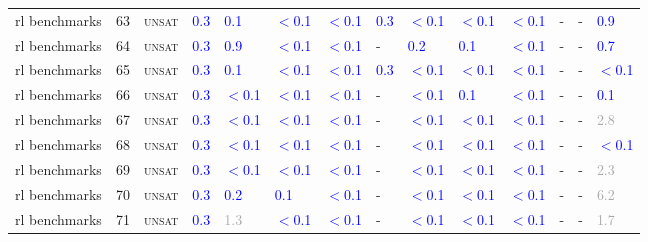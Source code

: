 \begin{center}
{\begin{longtable}{@{}llllllllllllll@{}}
rl benchmarks & 63 & \textsc{unsat} & \textcolor{blue}{0.3} & \textcolor{blue}{0.1} & \textcolor{blue}{$<$0.1} & \textcolor{blue}{$<$0.1} & \textcolor{blue}{0.3} & \textcolor{blue}{$<$0.1} & \textcolor{blue}{$<$0.1} & \textcolor{blue}{$<$0.1} & - & - & \textcolor{blue}{0.9} \\
rl benchmarks & 64 & \textsc{unsat} & \textcolor{blue}{0.3} & \textcolor{blue}{0.9} & \textcolor{blue}{$<$0.1} & \textcolor{blue}{$<$0.1} & - & \textcolor{blue}{0.2} & \textcolor{blue}{0.1} & \textcolor{blue}{$<$0.1} & - & - & \textcolor{blue}{0.7} \\
rl benchmarks & 65 & \textsc{unsat} & \textcolor{blue}{0.3} & \textcolor{blue}{0.1} & \textcolor{blue}{$<$0.1} & \textcolor{blue}{$<$0.1} & \textcolor{blue}{0.3} & \textcolor{blue}{$<$0.1} & \textcolor{blue}{$<$0.1} & \textcolor{blue}{$<$0.1} & - & - & \textcolor{blue}{$<$0.1} \\
rl benchmarks & 66 & \textsc{unsat} & \textcolor{blue}{0.3} & \textcolor{blue}{$<$0.1} & \textcolor{blue}{$<$0.1} & \textcolor{blue}{$<$0.1} & - & \textcolor{blue}{$<$0.1} & \textcolor{blue}{0.1} & \textcolor{blue}{$<$0.1} & - & - & \textcolor{blue}{0.1} \\
rl benchmarks & 67 & \textsc{unsat} & \textcolor{blue}{0.3} & \textcolor{blue}{$<$0.1} & \textcolor{blue}{$<$0.1} & \textcolor{blue}{$<$0.1} & - & \textcolor{blue}{$<$0.1} & \textcolor{blue}{$<$0.1} & \textcolor{blue}{$<$0.1} & - & - & \textcolor{darkgray}{2.8} \\
rl benchmarks & 68 & \textsc{unsat} & \textcolor{blue}{0.3} & \textcolor{blue}{$<$0.1} & \textcolor{blue}{$<$0.1} & \textcolor{blue}{$<$0.1} & - & \textcolor{blue}{$<$0.1} & \textcolor{blue}{$<$0.1} & \textcolor{blue}{$<$0.1} & - & - & \textcolor{blue}{$<$0.1} \\
rl benchmarks & 69 & \textsc{unsat} & \textcolor{blue}{0.3} & \textcolor{blue}{$<$0.1} & \textcolor{blue}{$<$0.1} & \textcolor{blue}{$<$0.1} & - & \textcolor{blue}{$<$0.1} & \textcolor{blue}{$<$0.1} & \textcolor{blue}{$<$0.1} & - & - & \textcolor{darkgray}{2.3} \\
rl benchmarks & 70 & \textsc{unsat} & \textcolor{blue}{0.3} & \textcolor{blue}{0.2} & \textcolor{blue}{0.1} & \textcolor{blue}{$<$0.1} & - & \textcolor{blue}{$<$0.1} & \textcolor{blue}{$<$0.1} & \textcolor{blue}{$<$0.1} & - & - & \textcolor{darkgray}{6.2} \\
rl benchmarks & 71 & \textsc{unsat} & \textcolor{blue}{0.3} & \textcolor{darkgray}{1.3} & \textcolor{blue}{$<$0.1} & \textcolor{blue}{$<$0.1} & - & \textcolor{blue}{$<$0.1} & \textcolor{blue}{$<$0.1} & \textcolor{blue}{$<$0.1} & - & - & \textcolor{darkgray}{1.7} \\

\end{longtable}}
\end{center}
